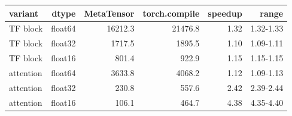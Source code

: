 \begin{tabular}{lrrrrr}
\toprule
variant & dtype & MetaTensor & torch.compile & speedup & range \\
\midrule
TF block & float64 & 16212.3 & 21476.8 & 1.32 & 1.32-1.33 \\
TF block & float32 & 1717.5 & 1895.5 & 1.10 & 1.09-1.11 \\
TF block & float16 & 801.4 & 922.9 & 1.15 & 1.15-1.15 \\
attention & float64 & 3633.8 & 4068.2 & 1.12 & 1.09-1.13 \\
attention & float32 & 230.8 & 557.6 & 2.42 & 2.39-2.44 \\
attention & float16 & 106.1 & 464.7 & 4.38 & 4.35-4.40 \\
\bottomrule
\end{tabular}
